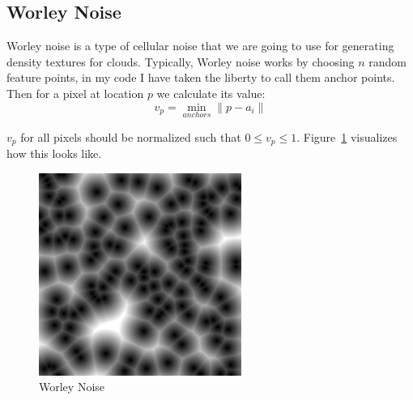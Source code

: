 \subsection{Worley Noise}
Worley noise is a type of cellular noise that we are going to use for generating density textures for clouds. Typically, Worley noise works by choosing $n$ random feature points, in my code I have taken the liberty to call them anchor points. Then for a pixel at location $p$ we calculate its value:
\[
v_p = \min_{anchors} \|p - a_i\| 
\]

$v_p$ for all pixels should be normalized such that $0 \le v_p \le 1$. Figure~\ref{fig:worley_eg} visualizes how this looks like.

\begin{figure}[H]
    \centering
    \begin{minipage}[t]{0.45\textwidth}
        \centering
        \includegraphics[width=\textwidth]{images/worley.jpg}
        \caption{Worley Noise \cite{wikipedia_worley} }
        \label{fig:worley_eg}
    \end{minipage}
    \hfill
    \begin{minipage}[t]{0.45\textwidth}
        \centering

\end{minipage}
\end{figure}
